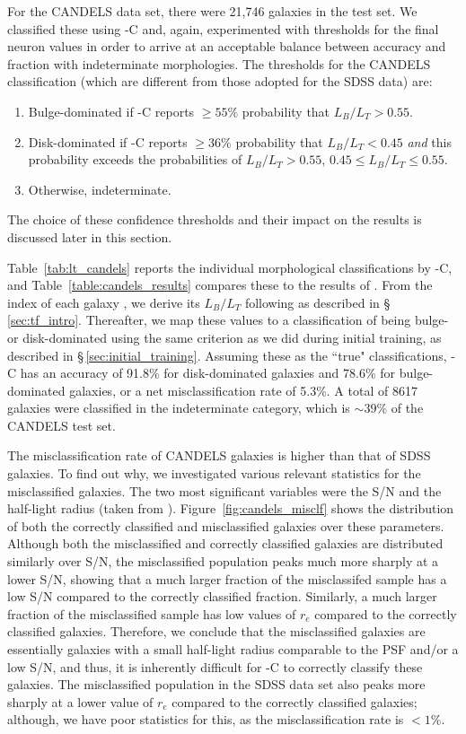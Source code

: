 For the CANDELS data set, there were 21,746 galaxies in the test set. We classified these using \gamornet{}-C and, again, experimented with thresholds for the final neuron values in order to arrive at an acceptable balance between accuracy and fraction with indeterminate morphologies. The thresholds for the CANDELS classification (which are different from those adopted for the SDSS data) are:
\begin{enumerate}[noitemsep]
    \item Bulge-dominated if \gamornet{}-C reports $\geq 55\%$ probability that $L_B/L_T > 0.55 $.
    \item Disk-dominated if \gamornet{}-C reports $\geq 36\%$ probability that $L_B/L_T < 0.45 $ {\it and} this probability exceeds the probabilities of $L_B/L_T > 0.55 $, $0.45 \leq L_B/L_T \leq 0.55 $.
    \item Otherwise, indeterminate.
\end{enumerate}
The choice of these confidence thresholds and their impact on the results is discussed later in this section. 

Table~\ref{tab:lt_candels} reports the individual morphological classifications by \gamornet{}-C, and
Table~\ref{table:candels_results} compares these to the results of \citet{vdw_12}. From the \sersic{} index of each galaxy \citep{vdw_12}, we derive its $L_B/L_T$ following \citet{simmons_08} as described in \S\,\ref{sec:tf_intro}. Thereafter, we map these values to a classification of being bulge- or disk-dominated using the same criterion as we did during initial training, as described in \S\,\ref{sec:initial_training}. Assuming these as the ``true" classifications, \gamornet{}-C has an accuracy of 91.8\% for disk-dominated galaxies and 78.6\% for bulge-dominated galaxies, or a net misclassification rate of 5.3\%. A total of 8617 galaxies were classified in the indeterminate category, which is $\sim39$\% of the CANDELS test set. 

The misclassification rate of CANDELS galaxies is higher than that of SDSS galaxies. To find out why, we investigated various relevant statistics for the misclassified galaxies. The two most significant variables were the S/N and the half-light radius (taken from \citealp{vdw_12}). Figure~\ref{fig:candels_misclf} shows the distribution of both the correctly classified and misclassified galaxies over these parameters. Although both the misclassified and correctly classified galaxies are distributed similarly over S/N, the misclassified population peaks much more sharply at a lower S/N, showing that a much larger fraction of the misclassifed sample has a low S/N compared to the correctly classified fraction. Similarly, a much larger fraction of the misclassified sample has low values of $r_e$ compared to the correctly classified galaxies. Therefore, we conclude that the misclassified galaxies are essentially galaxies with a small half-light radius comparable to the PSF and/or a low S/N, and thus, it is inherently difficult for \gamornet{}-C to correctly classify these galaxies. The misclassified population in the SDSS data set also peaks more sharply at a lower value of $r_e$ compared to the correctly classified galaxies; although, we have poor statistics for this, as the misclassification rate is $<1\%$. 


